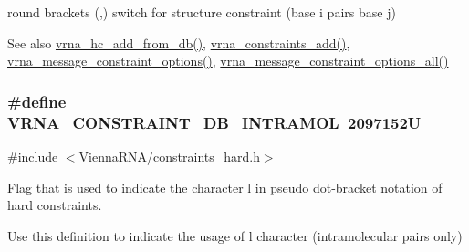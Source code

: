 round brackets \textquotesingle{}(\textquotesingle{},\textquotesingle{})\textquotesingle{} switch for structure constraint (base i pairs base j) 

\begin{DoxySeeAlso}{See also}
\hyperlink{group__hard__constraints_ga5b4de3247b67358080c176b94591a8e6}{vrna\+\_\+hc\+\_\+add\+\_\+from\+\_\+db()}, \hyperlink{group__constraints_ga35a401f680969a556858a8dd5f1d07cc}{vrna\+\_\+constraints\+\_\+add()}, \hyperlink{group__constraints_gaa1f20b53bf09ac2e6b0dbb13f7d89670}{vrna\+\_\+message\+\_\+constraint\+\_\+options()}, \hyperlink{group__constraints_gaec7e13fa0465c2acc7a621d1aecb709f}{vrna\+\_\+message\+\_\+constraint\+\_\+options\+\_\+all()} 
\end{DoxySeeAlso}
\hypertarget{group__hard__constraints_ga5c17253f5a39d1d49b0fb11f5196982a}{}
\subsubsection[{V\+R\+N\+A\+\_\+\+C\+O\+N\+S\+T\+R\+A\+I\+N\+T\+\_\+\+D\+B\+\_\+\+I\+N\+T\+R\+A\+M\+O\+L}]{\setlength{\rightskip}{0pt plus 5cm}\#define V\+R\+N\+A\+\_\+\+C\+O\+N\+S\+T\+R\+A\+I\+N\+T\+\_\+\+D\+B\+\_\+\+I\+N\+T\+R\+A\+M\+O\+L~2097152\+U}\label{group__hard__constraints_ga5c17253f5a39d1d49b0fb11f5196982a}


{\ttfamily \#include $<$\hyperlink{constraints__hard_8h}{Vienna\+R\+N\+A/constraints\+\_\+hard.\+h}$>$}



Flag that is used to indicate the character \textquotesingle{}l\textquotesingle{} in pseudo dot-\/bracket notation of hard constraints. 

Use this definition to indicate the usage of \textquotesingle{}l\textquotesingle{} character (intramolecular pairs only)

